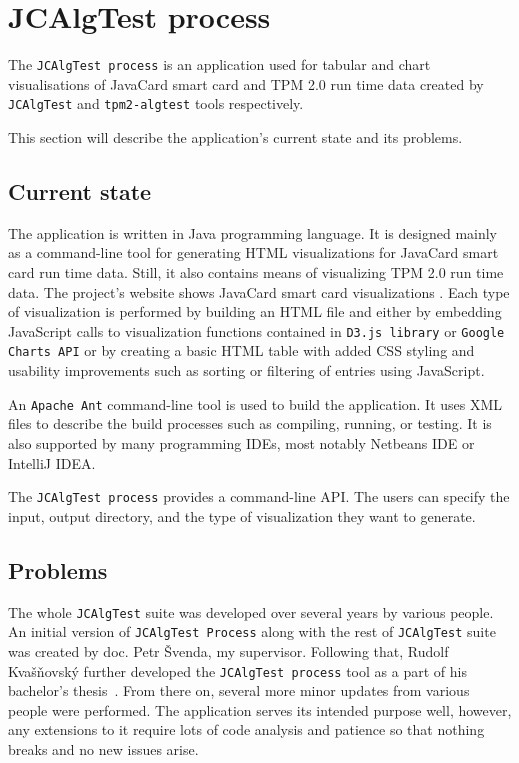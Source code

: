 \section{JCAlgTest process}
The \texttt{JCAlgTest process} is an application used for tabular and chart visualisations of JavaCard smart card and TPM 2.0 run time data created by \texttt{JCAlgTest} and \texttt{tpm2-algtest} tools respectively. 

This section will describe the application's current state and its problems.
\subsection{Current state}

The application is written in Java programming language. It is designed mainly as a command-line tool for generating HTML visualizations for JavaCard smart card run time data. Still, it also contains means of visualizing TPM 2.0 run time data. The project's website shows JavaCard smart card visualizations \cite{jcalgtestWeb}. Each type of visualization is performed by building an HTML file and either by embedding JavaScript calls to visualization functions contained in  \texttt{D3.js library} or \texttt{Google Charts API} or by creating a basic HTML table with added CSS styling and usability improvements such as sorting or filtering of entries using JavaScript. 

An \texttt{Apache Ant} command-line tool is used to build the application. It uses XML files to describe the build processes such as compiling, running, or testing. It is also supported by many programming IDEs, most notably Netbeans IDE or IntelliJ IDEA.

The \texttt{JCAlgTest process} provides a command-line API. The users can specify the input, output directory, and the type of visualization they want to generate.

\subsection{Problems}\label{subsec:design-problems}
The whole \texttt{JCAlgTest} suite was developed over several years by various people. An initial version of \texttt{JCAlgTest Process} along with the rest of \texttt{JCAlgTest} suite was created by doc. Petr Švenda, my supervisor. Following that, Rudolf Kvašňovský further developed the \texttt{JCAlgTest process} tool as a part of his bachelor's thesis~\cite{Kvasnovsky2016thesis}. From there on, several more minor updates from various people were performed. The application serves its intended purpose well, however, any extensions to it require lots of code analysis and patience so that nothing breaks and no new issues arise.

